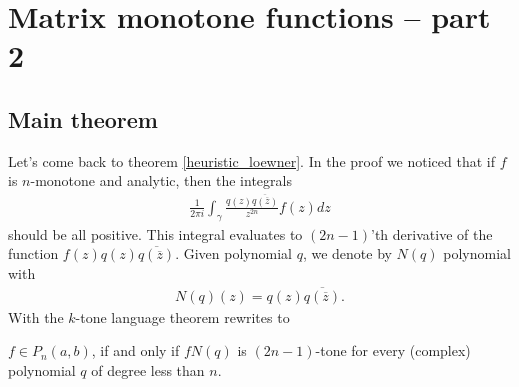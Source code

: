 \chapter{Matrix monotone functions -- part 2}

\section{Main theorem}

Let's come back to theorem \ref{heuristic_loewner}. In the proof we noticed that if $f$ is $n$-monotone and analytic, then the integrals
\begin{align*}
	\frac{1}{2 \pi i} \int_{\gamma}  \frac{q(z) \overline{q(\overline{z})}}{z^{2 n}} f(z) dz
\end{align*}
should be all positive. This integral evaluates to $(2 n - 1)$'th derivative of the function $f(z) q(z) \overline{q(\overline{z})}$. Given polynomial $q$, we denote by $N(q)$ polynomial with
\begin{align*}
	N(q)(z) = q(z) \overline{q(\overline{z})}.
\end{align*}
With the $k$-tone language theorem rewrites to

\begin{lause}\label{main_theorem}
	$f \in P_{n}(a, b)$, if and only if $f N(q)$ is $(2 n - 1)$-tone for every (complex) polynomial $q$ of degree less than $n$.
\end{lause}

